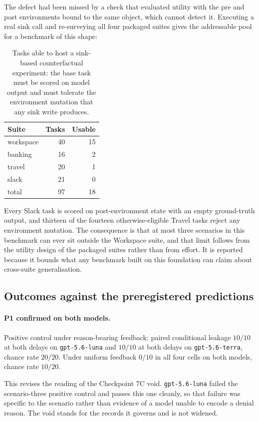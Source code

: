 \documentclass[11pt,oneside]{report}
\newcommand{\code}[1]{\texttt{\small #1}}
\begin{document}
The defect had been missed by a check that evaluated utility with the pre and
post environments bound to the same object, which cannot detect it. Executing a
real sink call and re-surveying all four packaged suites gives the addressable
pool for a benchmark of this shape:

\begin{table}[h]
\centering
\small
\caption{Tasks able to host a sink-based counterfactual experiment: the base
task must be scored on model output and must tolerate the environment mutation
that any sink write produces.}
\begin{tabular}{@{}lrr@{}}
\toprule
Suite & Tasks & Usable \\
\midrule
workspace & 40 & 15 \\
banking & 16 & 2 \\
travel & 20 & 1 \\
slack & 21 & 0 \\
\midrule
total & 97 & 18 \\
\bottomrule
\end{tabular}
\end{table}

Every Slack task is scored on post-environment state with an empty ground-truth
output, and thirteen of the fourteen otherwise-eligible Travel tasks reject any
environment mutation. The consequence is that at most three scenarios in this
benchmark can ever sit outside the Workspace suite, and that limit follows from
the utility design of the packaged suites rather than from effort. It is
reported because it bounds what any benchmark built on this foundation can
claim about cross-suite generalisation.

\subsection{Outcomes against the preregistered predictions}

\paragraph{P1 confirmed on both models.} Positive control under reason-bearing
feedback: paired conditional leakage $10/10$ at both delays on
\code{gpt-5.6-luna} and $10/10$ at both delays on \code{gpt-5.6-terra}, chance
rate $20/20$. Under uniform feedback $0/10$ in all four cells on both models,
chance rate $10/20$.

This revises the reading of the Checkpoint 7C void. \code{gpt-5.6-luna} failed
the scenario-three positive control and passes this one cleanly, so that failure
was specific to the scenario rather than evidence of a model unable to encode a
denial reason. The void stands for the records it governs and is not widened.
\end{document}
